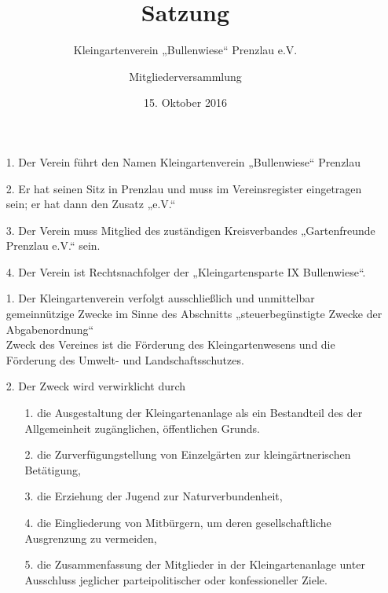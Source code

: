 \documentclass{scrartcl}
\title{\Huge Satzung}
\subtitle{\LARGE Kleingartenverein „Bullenwiese“ Prenzlau e.V.}
\author{Mitgliederversammlung}
\date{15. Oktober 2016}
\begin{document}
\maketitle
\tableofcontents

\newpage


	\begin{itemize}
		\item[1.] Der Verein führt den Namen Kleingartenverein „Bullenwiese“ Prenzlau
		\item[2.] Er hat seinen Sitz in Prenzlau und muss im Vereinsregister
				  eingetragen sein; er hat dann den Zusatz „e.V.“
		\item[3.] Der Verein muss Mitglied des zuständigen Kreisverbandes
		          „Gartenfreunde Prenzlau e.V.“ sein.
		\item[4.] Der Verein ist Rechtsnachfolger der 
				  „Kleingartensparte IX Bullenwiese“.
	\end{itemize}

		

\begin{itemize}
	\item[1.] Der Kleingartenverein verfolgt ausschließlich und unmittelbar
			  gemeinnützige Zwecke im Sinne des Abschnitts „steuerbegünstigte Zwecke
			  der Abgabenordnung“ \\
			  Zweck des Vereines ist die Förderung des Kleingartenwesens und die
			  Förderung des Umwelt- und Landschaftsschutzes.
	\item[2.] Der Zweck wird verwirklicht durch	
		\begin{itemize}
			\item[1.] die Ausgestaltung der Kleingartenanlage als ein Bestandteil
					  des der Allgemeinheit zugänglichen, öffentlichen Grunds.
			\item[2.] die Zurverfügungstellung von Einzelgärten zur kleingärtnerischen
					  Betätigung,
			\item[3.] die Erziehung der Jugend zur Naturverbundenheit,
			\item[4.] die Eingliederung von Mitbürgern, um deren gesellschaftliche
				      Ausgrenzung zu vermeiden,
			\item[5.] die Zusammenfassung der Mitglieder in der Kleingartenanlage unter
					  Ausschluss jeglicher parteipolitischer oder konfessioneller
					  Ziele.
		\end{itemize}
\end{itemize}
\end{document}
